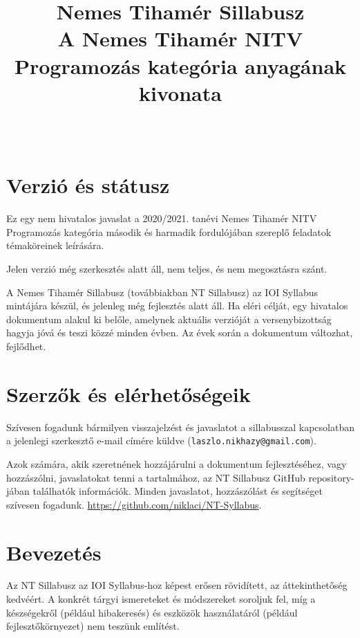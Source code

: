 \documentclass[a4paper,11pt,oneside]{article}
\begin{document}
\title{\sf Nemes Tihamér Sillabusz \\
    \large A Nemes Tihamér NITV Programozás kategória anyagának kivonata}
\author{}
\date{~}
\maketitle

\section{Verzió és státusz}%

Ez egy nem hivatalos javaslat a 2020/2021. tanévi Nemes Tihamér NITV Programozás kategória
második és harmadik fordulójában szereplő feladatok témaköreinek leírására.

\medskip

Jelen verzió még szerkesztés alatt áll, nem teljes, és nem megosztásra szánt.

\medskip

A Nemes Tihamér Sillabusz (továbbiakban NT Sillabusz) az IOI Syllabus mintájára készül,
és jelenleg még fejlesztés alatt áll. Ha eléri célját, egy hivatalos dokumentum alakul ki belőle,
amelynek aktuális verzióját a versenybizottság hagyja jóvá és teszi közzé minden évben.
Az évek során a dokumentum változhat, fejlődhet.


\section{Szerzők és elérhetőségeik}%

Szívesen fogadunk bármilyen visszajelzést és javaslatot a sillabusszal kapcsolatban
a jelenlegi szerkesztő e-mail címére küldve (\verb!laszlo.nikhazy@gmail.com!).

Azok számára, akik szeretnének hozzájárulni a dokumentum fejlesztéséhez, vagy hozzászólni,
javaslatokat tenni a tartalmához, az NT Sillabusz GitHub repository-jában találhatók információk.
Minden javaslatot, hozzászólást és segítséget szívesen fogadunk.
\url{https://github.com/niklaci/NT-Syllabus}.

\section{Bevezetés}\label{sec:intro}%

Az NT Sillabusz az IOI Syllabus-hoz képest erősen rövidített, az áttekinthetőség kedvéért.
A konkrét tárgyi ismereteket és módszereket soroljuk fel, míg a készségekről (például hibakeresés)
és eszközök használatáról (például fejlesztőkörnyezet) nem teszünk említést.
\end{document}
